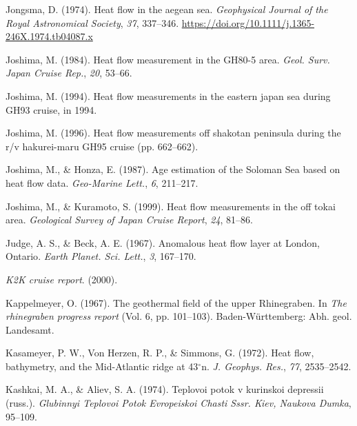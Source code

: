 \documentclass[draft,linenumbers]{agujournal2018}
\begin{document}
\leavevmode{}%
Jongsma, D. (1974). Heat flow in the aegean sea. \emph{Geophysical
Journal of the Royal Astronomical Society}, \emph{37}, 337--346.
\url{https://doi.org/10.1111/j.1365-246X.1974.tb04087.x}

\leavevmode{}%
Joshima, M. (1984). Heat flow measurement in the GH80-5 area.
\emph{Geol. Surv. Japan Cruise Rep.}, \emph{20}, 53--66.

\leavevmode{}%
Joshima, M. (1994). Heat flow measurements in the eastern japan sea
during GH93 cruise, in 1994.

\leavevmode{}%
Joshima, M. (1996). Heat flow measurements off shakotan peninsula during
the r/v hakurei-maru GH95 cruise (pp. 662--662).

\leavevmode{}%
Joshima, M., \& Honza, E. (1987). Age estimation of the {Soloman Sea}
based on heat flow data. \emph{Geo-Marine Lett.}, \emph{6}, 211--217.

\leavevmode{}%
Joshima, M., \& Kuramoto, S. (1999). Heat flow measurements in the off
tokai area. \emph{Geological Survey of Japan Cruise Report}, \emph{24},
81--86.

\leavevmode{}%
Judge, A. S., \& Beck, A. E. (1967). Anomalous heat flow layer at
{London, Ontario}. \emph{Earth Planet. Sci. Lett.}, \emph{3}, 167--170.

\leavevmode{}%
\emph{K2K cruise report}. (2000).

\leavevmode{}%
Kappelmeyer, O. (1967). The geothermal field of the upper {Rhinegraben}.
In \emph{The rhinegraben progress report} (Vol. 6, pp. 101--103).
Baden-W{ü}rttemberg: Abh. geol. Landesamt.

\leavevmode{}%
Kasameyer, P. W., Von Herzen, R. P., \& Simmons, G. (1972). Heat flow,
bathymetry, and the {Mid-Atlantic} ridge at 43\(^\circ\)n. \emph{J.
Geophys. Res.}, \emph{77}, 2535--2542.

\leavevmode{}%
Kashkai, M. A., \& Aliev, S. A. (1974). Teplovoi potok v kurinskoi
depressii (russ.). \emph{Glubinnyi Teplovoi Potok Evropeiskoi Chasti
Sssr. Kiev, Naukova Dumka}, 95--109.
\end{document}
